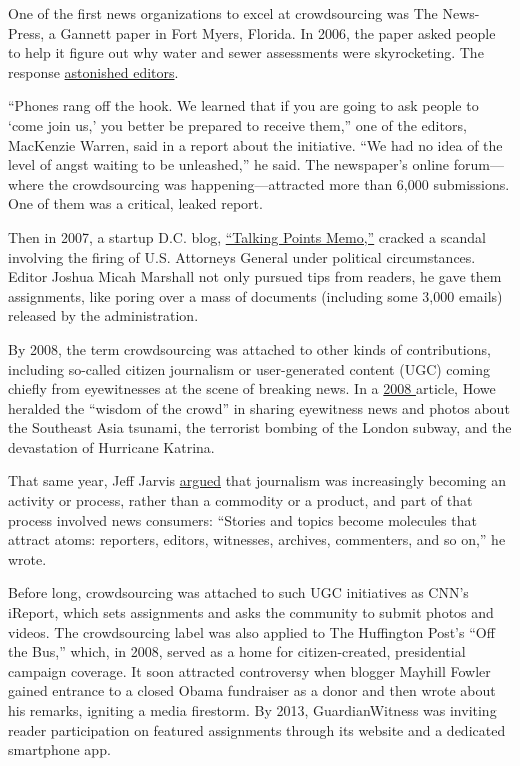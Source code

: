 \begin{itemize}
One of the first news organizations to excel at crowdsourcing was The News-Press, a Gannett paper in Fort Myers, Florida. In 2006, the paper asked people to help it figure out why water and sewer assessments were skyrocketing. The response \href{http://www.crowdsourcing.com/cs/2006/11/the_new_investi.html}{astonished editors}. \autocite{FortMyers}

“Phones rang off the hook. We learned that if you are going to ask people to ‘come join us,’ you better be prepared to receive them,” one of the editors, MacKenzie Warren, said in a report about the initiative. \autocite{FortMyers} “We had no idea of the level of angst waiting to be unleashed,” he said. The newspaper’s online forum---where the crowdsourcing was happening---attracted more than 6,000 submissions. One of them was a critical, leaked report. 

Then in 2007, a startup D.C. blog, \href{http://www.nytimes.com/2008/02/25/business/media/25marshall.html?_r=3&oref=slogin&ref=todayspaper&pagewanted=print&}{``Talking Points Memo,''} cracked a scandal involving the firing of U.S. Attorneys General under political circumstances. Editor Joshua Micah Marshall not only pursued tips from readers, he gave them assignments, like poring over a mass of documents (including some 3,000 emails) released by the administration.\autocite{talkingpoints} 

By 2008, the term crowdsourcing was attached to other kinds of contributions, including so-called citizen journalism or user-generated content (UGC) coming chiefly from eyewitnesses at the scene of breaking news. In a \href{http://niemanreports.org/articles/the-wisdom-of-the-crowd-resides-in-how-the-crowd-is-used/}{2008 } article, Howe heralded the ``wisdom of the crowd'' in sharing eyewitness news and photos about the Southeast Asia tsunami, the terrorist bombing of the London subway, and the devastation of Hurricane Katrina.\autocite{Nieman}

That same year, Jeff Jarvis \href{http://buzzmachine.com/2008/04/14/the-press-becomes-the-press-sphere/}{argued} that journalism was increasingly becoming an activity or process, rather than a commodity or a product, and part of that process involved news consumers: ``Stories and topics become molecules that attract atoms: reporters, editors, witnesses, archives, commenters, and so on,'' he wrote.\autocite{Jarvis}

Before long, crowdsourcing was attached to such UGC initiatives as CNN’s iReport, which sets assignments and asks the community to submit photos and videos. The crowdsourcing label was also applied to The Huffington Post’s ``Off the Bus,'' which, in 2008, served as a home for citizen-created, presidential campaign coverage. It soon attracted controversy when blogger Mayhill Fowler gained entrance to a closed Obama fundraiser as a donor and then wrote about his remarks, igniting a media firestorm. By 2013, GuardianWitness was inviting reader participation on featured assignments through its website and a dedicated smartphone app. 


\end{itemize}
